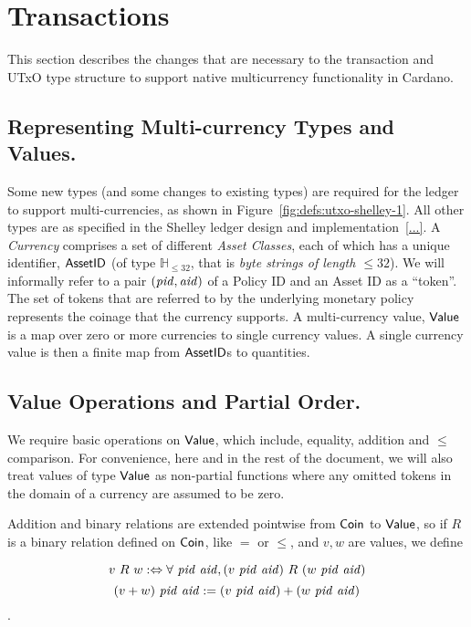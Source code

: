\section{Transactions}
\label{sec:transactions}

This section describes the changes that are necessary to the transaction and
UTxO type structure to support native multicurrency functionality
in Cardano.

\subsection*{Representing Multi-currency Types and Values.}
Some new types (and some changes to existing types) are required for
the ledger to support multi-currencies, as shown in Figure~\ref{fig:defs:utxo-shelley-1}.
All other types are as specified in the Shelley ledger design and implementation~\ref{...}.
A \emph{Currency} comprises a set of different \emph{Asset Classes}, each of which has
a unique identifier, $\mathsf{AssetID}$  (of type $\mathbb{H}_{\leq 32}$, that is \emph{byte strings of length $\leq 32$}). We will informally refer to a pair $(\mathit{pid}, \mathit{aid})$ of a Policy ID and an Asset ID as a ``token''.
The set of tokens that are referred to by the underlying monetary policy represents the coinage that the currency supports.  A multi-currency value, $\mathsf{Value}$ is a map over zero or more currencies
to single currency values.  A single currency value is then a finite map from
$\mathsf{AssetID}$s to quantities.

\subsection*{Value Operations and Partial Order.}
We require basic operations on $\mathsf{Value}$, which include, equality, addition and $\leq$ comparison.
For convenience, here and in the rest of the document, we
will also treat values of type $\mathsf{Value}$ as non-partial functions where
any omitted tokens in the domain of a currency are assumed to be zero.

Addition and binary relations are extended pointwise from $\mathsf{Coin}$ to $\mathsf{Value}$, so if $R$ is a binary relation defined on $\mathsf{Coin}$, like $=$ or $\leq$, and $v, w$ are values, we define

\[ v~R~w :\Leftrightarrow \forall~\mathit{pid}~\mathit{aid}, (v~\mathit{pid}~\mathit{aid})~R~(w~\mathit{pid}~\mathit{aid}) \]
\[(v + w)~\mathit{pid}~\mathit{aid} := (v~\mathit{pid}~\mathit{aid}) + (w~\mathit{pid}~\mathit{aid}) \].

